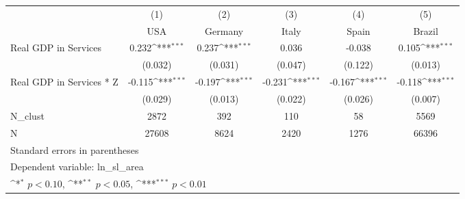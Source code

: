 {
\def\sym#1{\ifmmode^{#1}\else\(^{#1}\)\fi}
\begin{tabular}{l*{5}{c}}
\hline\hline
            &\multicolumn{1}{c}{(1)}&\multicolumn{1}{c}{(2)}&\multicolumn{1}{c}{(3)}&\multicolumn{1}{c}{(4)}&\multicolumn{1}{c}{(5)}\\
            &\multicolumn{1}{c}{USA}&\multicolumn{1}{c}{Germany}&\multicolumn{1}{c}{Italy}&\multicolumn{1}{c}{Spain}&\multicolumn{1}{c}{Brazil}\\
\hline
Real GDP in Services&       0.232\sym{***}&       0.237\sym{***}&       0.036         &      -0.038         &       0.105\sym{***}\\
            &     (0.032)         &     (0.031)         &     (0.047)         &     (0.122)         &     (0.013)         \\
[1em]
Real GDP in Services * Z&      -0.115\sym{***}&      -0.197\sym{***}&      -0.231\sym{***}&      -0.167\sym{***}&      -0.118\sym{***}\\
            &     (0.029)         &     (0.013)         &     (0.022)         &     (0.026)         &     (0.007)         \\
\hline
N\_clust     &        2872         &         392         &         110         &          58         &        5569         \\
N           &       27608         &        8624         &        2420         &        1276         &       66396         \\
\hline\hline
\multicolumn{6}{l}{\footnotesize Standard errors in parentheses}\\
\multicolumn{6}{l}{\footnotesize Dependent variable: ln\_sl\_area}\\
\multicolumn{6}{l}{\footnotesize \sym{*} \(p<0.10\), \sym{**} \(p<0.05\), \sym{***} \(p<0.01\)}\\
\end{tabular}
}
